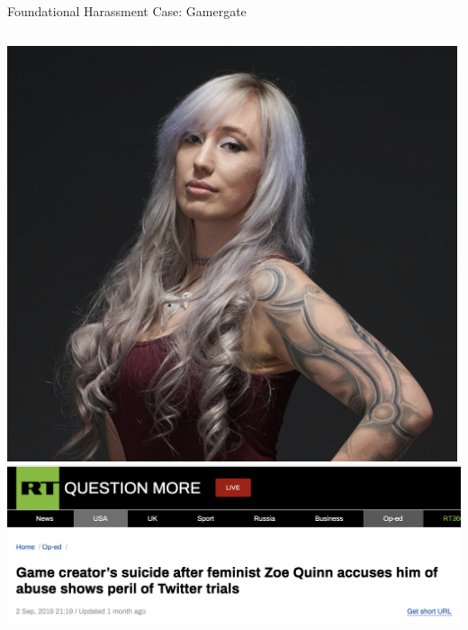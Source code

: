 \documentclass[nobackground,dvipsnames,table,aspectratio=169]{beamer}
\begin{document}
\begin{frame}{Foundational Harassment Case: Gamergate}
\begin{columns}
\begin{columns}
                    \includegraphics[width=\textwidth]{zoe-quinn}
                    \includegraphics[width=\textwidth]{rt-zoe-quinn}
            \end{columns}
    \end{columns}
\end{frame}
\end{document}
